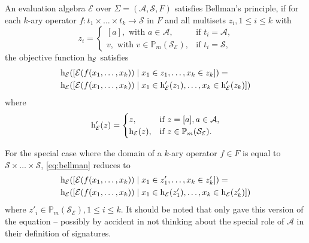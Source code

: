 \documentclass[
    a4paper,
    12pt,
    twoside,
    BCOR=12mm,
    parskip=half,
    chapterprefix,
    numbers=noenddot,
    bibliography=totoc
]{scrbook}
\begin{document}
\begin{definition}
	\label{def:bellmans_principle}
	An evaluation algebra $\mathcal{E}$ over $\Sigma=(\mathcal{A},\mathcal{S},F)$ satisfies Bellman's principle, if for each $k$-ary operator $f : t_1 \times \ldots \times t_k \to \mathcal{S}$ in $F$ and all multisets $z_i, 1 \leq i \leq k$ with 
	\begin{equation*}
		z_i=\begin{cases}
			[a], \text{ with } a \in \mathcal{A},  & \text{if $t_i=\mathcal{A}$,}\\
			v, \text{ with } v \in \mathbb{P}_m(\mathcal{S}_\mathcal{E}),    & \text{if $t_i=\mathcal{S}$,}
		\end{cases}
	\end{equation*}
	the objective function $\mathrm{h}_\mathcal{E}$ satisfies
	\begin{equation}
	\label{eq:bellman}
		\begin{aligned}
			& \mathrm{h}_\mathcal{E} ( [ \mathcal{E}(f(x_1,\ldots,x_k)) \mid x_1 \in z_1,\ldots,x_k \in z_k] ) =\\
			& \mathrm{h}_\mathcal{E} ( [ \mathcal{E}(f(x_1,\ldots,x_k)) \mid x_1 \in \mathrm{h}'_\mathcal{E}(z_1),\ldots, x_k \in \mathrm{h}'_\mathcal{E}(z_k)] )
		\end{aligned}
	\end{equation}
	where
	\begin{equation*}
		\mathrm{h}'_\mathcal{E}(z)=\begin{cases}
			z,  & \text{if $z=[a], a \in \mathcal{A}$,}\\
			\mathrm{h}_\mathcal{E}(z), & \text{if $z \in \mathbb{P}_m(\mathcal{S}_\mathcal{E})$.}
		\end{cases}
	\end{equation*}
\end{definition}

\begin{remark}
	For the special case where the domain of a $k$-ary operator $f \in F$ is equal to $\mathcal{S} \times \ldots \times \mathcal{S}$, \cref{eq:bellman} reduces to
	\begin{equation*}
		\begin{aligned}
			& \mathrm{h}_\mathcal{E} ( [ \mathcal{E}(f(x_1,\ldots,x_k)) \mid x_1 \in z'_1,\ldots,x_k \in z'_k] ) =\\
			& \mathrm{h}_\mathcal{E} ( [ \mathcal{E}(f(x_1,\ldots,x_k)) \mid x_1 \in \mathrm{h}_\mathcal{E}(z'_1),\ldots, x_k \in \mathrm{h}_\mathcal{E}(z'_k)] )
		\end{aligned}
	\end{equation*}
	where $z'_i \in \mathbb{P}_m(\mathcal{S}_\mathcal{E}), 1 \leq i \leq k$. It should be noted that \citet{giegerich_discipline_2004} only gave this version of the equation -- possibly by accident in not thinking about the special role of $\mathcal{A}$ in their definition of signatures.
\end{remark}
\end{document}
